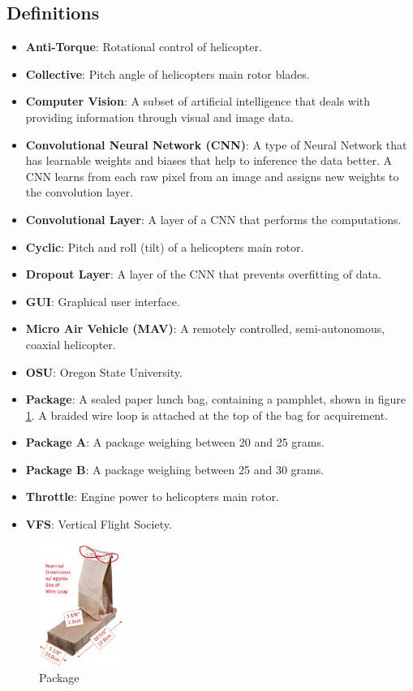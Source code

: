 \documentclass[onecolumn, oneside, letterpaper, draftclsnofoot, 10pt, compsoc]{IEEEtran}
\begin{document}
\subsection{Definitions}
\begin{itemize}
    \item \textbf{Anti-Torque}: Rotational control of helicopter.
    \item \textbf{Collective}: Pitch angle of helicopter\textquotesingle s main rotor blades.
    \item \textbf{Computer Vision}: A subset of artificial intelligence that deals with providing information through visual and image data.
    \item \textbf{Convolutional Neural Network (CNN)}: A type of Neural Network that has learnable weights and biases that help to inference the data better. A CNN learns from each raw pixel from an image and assigns new weights to the convolution layer.
    \item \textbf{Convolutional Layer}: A layer of a CNN that performs the computations.
    \item \textbf{Cyclic}: Pitch and roll (tilt) of a helicopter\textquotesingle s main rotor.
    \item \textbf{Dropout Layer}: A layer of the CNN that prevents overfitting of data.
    \item \textbf{GUI}: Graphical user interface.
    \item \textbf{Micro Air Vehicle (MAV)}: A remotely controlled, semi-autonomous, coaxial helicopter.
    \item \textbf{OSU}: Oregon State University.
    \item \textbf{Package}: A sealed paper lunch bag, containing a pamphlet, shown in figure \ref{fig:Bag}. A braided wire loop is attached at the top of the bag for acquirement.
    \item \textbf{Package A}: A package weighing between 20 and 25 grams.
    \item \textbf{Package B}: A package weighing between 25 and 30 grams.
    \item \textbf{Throttle}: Engine power to helicopter\textquotesingle s main rotor.
    \item \textbf{VFS}: Vertical Flight Society.
\end{itemize}
\begin{figure}[h]
    \centering
    \includegraphics[height=4cm]{graphics/bag.eps}
    \caption{Package}
    \label{fig:Bag}
\end{figure}
\end{document}
